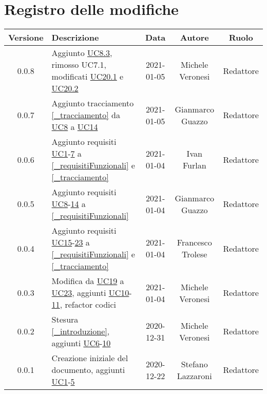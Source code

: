 \section*{Registro delle modifiche}

\begin{center}
	\begin{longtable}{|c|p{5cm}|c|c|c|}
	\hline
	\rowcolor{lighter-grayer}
	\textbf{Versione} & \textbf{Descrizione} & \textbf{Data} & \textbf{Autore} & \textbf{Ruolo} \\
	\hline
	\endfirsthead


	\hline
	0.0.8 & Aggiunto \hyperref[UC8.3]{UC8.3}, rimosso UC7.1, modificati \hyperref[UC20.1]{UC20.1} e \hyperref[UC20.2]{UC20.2} & 2021-01-05 & Michele Veronesi & Redattore \\
	0.0.7 & Aggiunto tracciamento \ref{_tracciamento} da \hyperref[UC8]{UC8} a \hyperref[UC14]{UC14} & 2021-01-05 & Gianmarco Guazzo & Redattore \\
	0.0.6 & Aggiunto requisiti \hyperref[UC1]{UC1}-\hyperref[UC7]{7} a \ref{_requisitiFunzionali} e \ref{_tracciamento} & 2021-01-04 & Ivan Furlan & Redattore \\
	0.0.5 & Aggiunto requisiti \hyperref[UC8]{UC8}-\hyperref[UC14]{14} a \ref{_requisitiFunzionali} & 2021-01-04 & Gianmarco Guazzo & Redattore \\
	0.0.4 & Aggiunto requisiti \hyperref[UC15]{UC15}-\hyperref[UC23]{23} a \ref{_requisitiFunzionali} e \ref{_tracciamento} & 2021-01-04 & Francesco Trolese & Redattore \\
	0.0.3 & Modifica da \hyperref[UC19]{UC19} a \hyperref[UC23]{UC23}, aggiunti \hyperref[UC10]{UC10}-\hyperref[UC11]{11}, refactor codici & 2021-01-04 & Michele Veronesi & Redattore \\
	0.0.2 & Stesura \ref{_introduzione}, aggiunti \hyperref[UC6]{UC6}-\hyperref[UC10]{10} & 2020-12-31 & Michele Veronesi & Redattore\\
    0.0.1 & Creazione iniziale del documento, aggiunti \hyperref[UC1]{UC1}-\hyperref[UC5]{5} & 2020-12-22 & Stefano Lazzaroni & Redattore\\
	\hline

	\end{longtable}
\end{center}